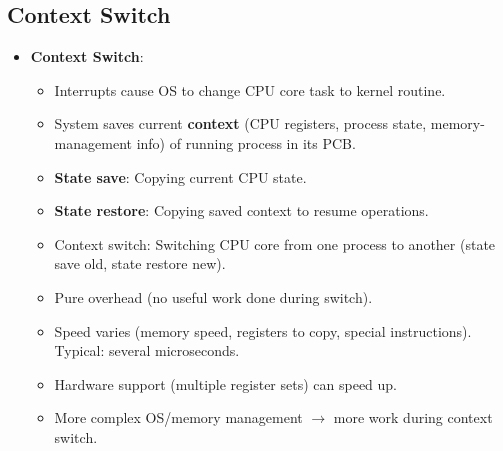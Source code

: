 \subsection{Context Switch}
\begin{itemize}
    \item \textbf{Context Switch}:
        \begin{itemize}
            \item Interrupts cause OS to change CPU core task to kernel routine.
            \item System saves current \textbf{context} (CPU registers, process state, memory-management info) of running process in its PCB.
            \item \textbf{State save}: Copying current CPU state.
            \item \textbf{State restore}: Copying saved context to resume operations.
            \item Context switch: Switching CPU core from one process to another (state save old, state restore new).
            \item Pure overhead (no useful work done during switch).
            \item Speed varies (memory speed, registers to copy, special instructions). Typical: several microseconds.
            \item Hardware support (multiple register sets) can speed up.
            \item More complex OS/memory management $\rightarrow$ more work during context switch.
        \end{itemize}
\end{itemize}
